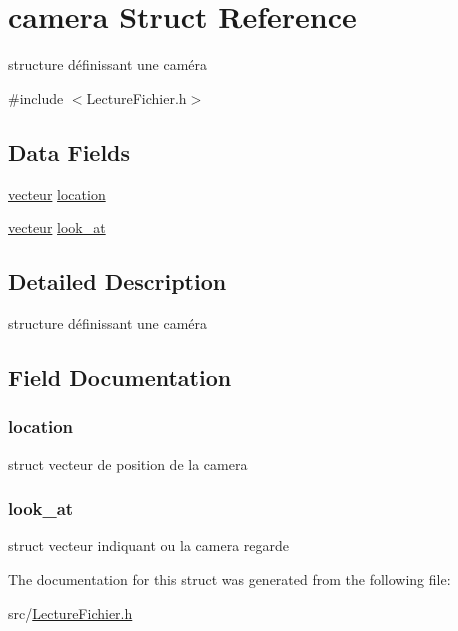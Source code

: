 \hypertarget{structcamera}{
\section{camera Struct Reference}
\label{structcamera}
}


structure définissant une caméra  




{\ttfamily \#include $<$LectureFichier.h$>$}

\subsection*{Data Fields}
\begin{DoxyCompactItemize}
\item 
\hyperlink{structvecteur}{vecteur} \hyperlink{structcamera_ae655d799d0a983ee8cf5fc840953c404}{location}
\item 
\hyperlink{structvecteur}{vecteur} \hyperlink{structcamera_ad7647430b05d8095b7d29aa66b7bfb1a}{look\_\-at}
\end{DoxyCompactItemize}


\subsection{Detailed Description}
structure définissant une caméra 

\subsection{Field Documentation}
\hypertarget{structcamera_ae655d799d0a983ee8cf5fc840953c404}{
\subsubsection[{location}]{ {\bf location}}}
\label{structcamera_ae655d799d0a983ee8cf5fc840953c404}
struct vecteur de position de la camera \hypertarget{structcamera_ad7647430b05d8095b7d29aa66b7bfb1a}{
\subsubsection[{look\_\-at}]{ {\bf look\_\-at}}}
\label{structcamera_ad7647430b05d8095b7d29aa66b7bfb1a}
struct vecteur indiquant ou la camera regarde 

The documentation for this struct was generated from the following file:\begin{DoxyCompactItemize}
\item 
src/\hyperlink{_lecture_fichier_8h}{LectureFichier.h}\end{DoxyCompactItemize}
